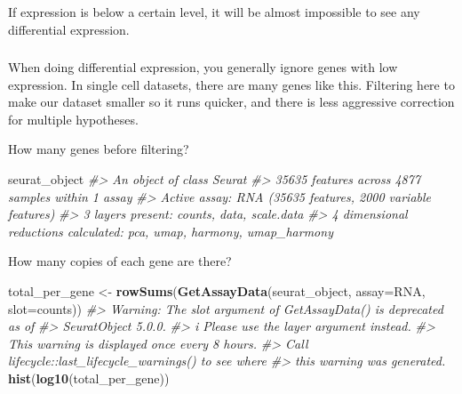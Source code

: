\documentclass[
]{book}
\newenvironment{Shaded}{\begin{snugshade}}{\end{snugshade}}
\newcommand{\AttributeTok}[1]{\textcolor[rgb]{0.13,0.29,0.53}{#1}}
\newcommand{\CommentTok}[1]{\textcolor[rgb]{0.56,0.35,0.01}{\textit{#1}}}
\newcommand{\FunctionTok}[1]{\textcolor[rgb]{0.13,0.29,0.53}{\textbf{#1}}}
\newcommand{\NormalTok}[1]{#1}
\newcommand{\OtherTok}[1]{\textcolor[rgb]{0.56,0.35,0.01}{#1}}
\newcommand{\StringTok}[1]{\textcolor[rgb]{0.31,0.60,0.02}{#1}}
\begin{document}
If expression is below a certain level, it will be almost impossible to see any differential expression.

\hypertarget{section-13}{%
\subsubsection*{}\label{section-13}}

When doing differential expression, you generally ignore genes with low expression.
In single cell datasets, there are many genes like this. Filtering here to make our dataset smaller so it runs quicker, and there is less aggressive correction for multiple hypotheses.

How many genes before filtering?

\begin{Shaded}
\begin{Highlighting}[]
\NormalTok{seurat\_object}
\CommentTok{\#\textgreater{} An object of class Seurat }
\CommentTok{\#\textgreater{} 35635 features across 4877 samples within 1 assay }
\CommentTok{\#\textgreater{} Active assay: RNA (35635 features, 2000 variable features)}
\CommentTok{\#\textgreater{}  3 layers present: counts, data, scale.data}
\CommentTok{\#\textgreater{}  4 dimensional reductions calculated: pca, umap, harmony, umap\_harmony}
\end{Highlighting}
\end{Shaded}

How many copies of each gene are there?

\begin{Shaded}
\begin{Highlighting}[]
\NormalTok{total\_per\_gene }\OtherTok{\textless{}{-}} \FunctionTok{rowSums}\NormalTok{(}\FunctionTok{GetAssayData}\NormalTok{(seurat\_object, }\AttributeTok{assay=}\StringTok{\textquotesingle{}RNA\textquotesingle{}}\NormalTok{, }\AttributeTok{slot=}\StringTok{\textquotesingle{}counts\textquotesingle{}}\NormalTok{))}
\CommentTok{\#\textgreater{} Warning: The \textasciigrave{}slot\textasciigrave{} argument of \textasciigrave{}GetAssayData()\textasciigrave{} is deprecated as of}
\CommentTok{\#\textgreater{} SeuratObject 5.0.0.}
\CommentTok{\#\textgreater{} i Please use the \textasciigrave{}layer\textasciigrave{} argument instead.}
\CommentTok{\#\textgreater{} This warning is displayed once every 8 hours.}
\CommentTok{\#\textgreater{} Call \textasciigrave{}lifecycle::last\_lifecycle\_warnings()\textasciigrave{} to see where}
\CommentTok{\#\textgreater{} this warning was generated.}
\FunctionTok{hist}\NormalTok{(}\FunctionTok{log10}\NormalTok{(total\_per\_gene))}
\end{Highlighting}
\end{Shaded}
\end{document}
